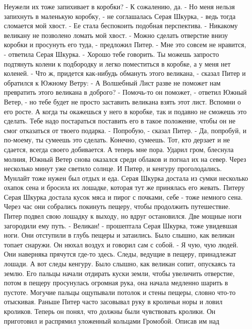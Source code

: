 Неужели их тоже запихивает в коробки?
    - К сожалению, да.
    - Но меня нельзя запихнуть в маленькую коробку, - не соглашалась 
Серая Шкурка, - ведь тогда сломается мой хвост. - Ее стала беспокоить 
подобная перспектива. - Никакому великану не позволено ломать мой 
хвост.
    - Можно сделать отверстие внизу коробки и просунуть его туда, - 
предложил Питер.
    - Мне это совсем не нравится, - ответила Серая Шкурка. - Хорошо 
тебе говорить. Ты можешь запросто подтянуть колени к подбородку и 
легко поместиться в коробке, а у меня нет коленей.
    - Что ж, придется как-нибудь обмануть этого великана, - сказал 
Питер и обратился к Южному Ветру:
    - А Волшебный Лист разве не поможет нам превратить этого великана 
в доброго?
    - Помочь-то он поможет, - ответил Южный Ветер, - но тебе будет не 
просто заставить великана взять этот лист. Вспомни о его росте. А 
когда ты окажешься у него в коробке, так и подавно не сможешь это 
сделать. Тебе надо постараться поставить его в такое положение, чтобы 
он не смог отказаться от твоего подарка.
    - Попробую, - сказал Питер.
    - Да, попробуй, и по-моему, ты сумеешь это сделать. Конечно, 
сумеешь. Тот, кто дерзает и не сдается, всегда своего добивается. А 
теперь мне пора.
    Ударил гром, блеснула молния, Южный Ветер снова оказался среди 
облаков и погнал их на север. Через несколько минут уже светило 
солнце.
    И Питер, и кенгуру проголодались. Мунлайт тоже нужен был отдых и 
еда. Серая Шкурка достала из сумки несколько охапок сена и бросила их 
лошадке, которая тут же принялась его жевать. Питеру Серая Шкурка 
достала кусок мяса и пирог с почками, себе - тоже немного сена.
    Через час они собрались покинуть пещеру, чтобы продолжить 
путешествие. Питер подвел свою лошадку к выходу, но вдруг остановился. 
Две мощные ноги загородили ему путь.
    - Великан! - прошептала Серая Шкурка, тоже увидевшая ноги. Они 
отступили в глубь пещеры и затаились. Было слышно, как великан топает 
снаружи. Он нюхал воздух и говорил сам с собой.
    - Я чую, чую людей. Они наверняка прячутся где-то здесь. Следы, 
ведущие в пещеру, принадлежат лошади. А вот следы кенгуру.
    Было слышно, как великан сопит, опускаясь та землю. Его пальцы 
начали отдирать куски земли, чтобы увеличить отверстие, потом в пещеру 
просунулась огромная рука, она начала медленно шарить в пустоте. 
Могучие пальцы ощупывали потолок и стены пещеры, словно что-то 
отыскивая.
    Раньше Питер часто засовывал руку в кроличьи норы и ловил 
кроликов. Теперь он понял, что должны были чувствовать кролики. Он 
приготовил и распрямил уложенный кольцами Громобой. Описав им над 
